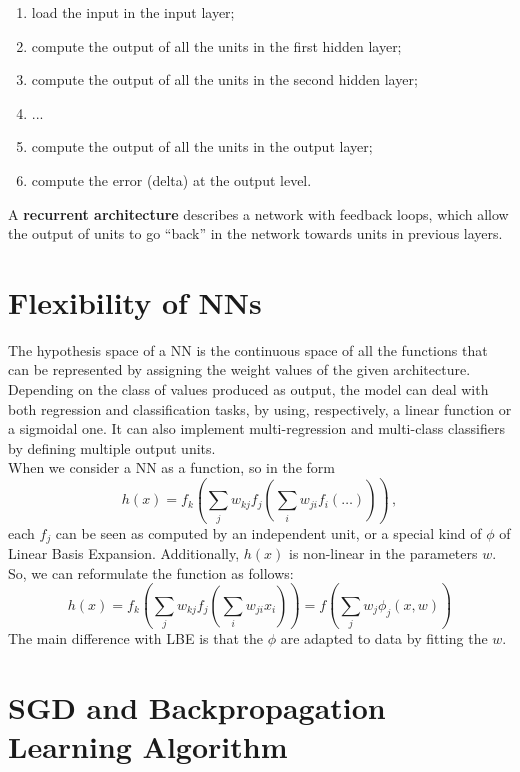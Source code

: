 \begin{enumerate}
    \item load the input in the input layer;
    \item compute the output of all the units in the first hidden layer;
    \item compute the output of all the units in the second hidden layer;
    \item ...
    \item compute the output of all the units in the output layer;
    \item compute the error (delta) at the output level.
\end{enumerate}
A \textbf{recurrent architecture} describes a network with feedback loops, which allow the output of units to go ``back'' in the network towards units in previous layers.

\section{Flexibility of NNs}

The hypothesis space of a NN is the continuous space of all the functions that can be represented by assigning the weight values of the given architecture. Depending on the class of values produced as output, the model can deal with both regression and classification tasks, by using, respectively, a linear function or a sigmoidal one. It can also implement multi-regression and multi-class classifiers by defining multiple output units. \\
When we consider a NN as a function, so in the form
\begin{equation*}
    h(x) = f_k(\sum_j w_{kj} f_j (\sum_i w_{ji} f_i(\dots))) \, ,
\end{equation*}
each $f_j$ can be seen as computed by an independent unit, or a special kind of $\phi$ of Linear Basis Expansion. Additionally, $h(x)$ is non-linear in the parameters $w$. So, we can reformulate the function as follows:
\begin{equation*}
    h(x) = f_k(\sum_j w_{kj} f_j (\sum_i w_{ji} x_i)) = f(\sum_j w_j \phi_j(x,w))
\end{equation*}
The main difference with LBE is that the $\phi$ are adapted to data by fitting the $w$.

\section{SGD and Backpropagation Learning Algorithm}

